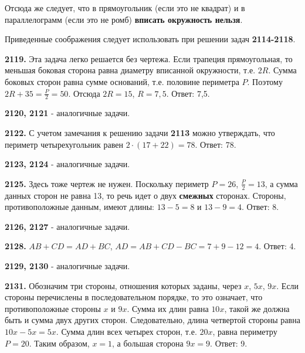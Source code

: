 Отсюда же следует, что в прямоугольник (если это не квадрат) и в параллелограмм (если это не ромб) \textbf{вписать окружность нельзя}.  

Приведенные соображения следует использовать при решении задач \textbf{2114-2118}.

\textbf{2119.} Эта задача легко решается без чертежа. Если трапеция прямоугольная, то меньшая боковая сторона равна диаметру вписанной окружности, т.е. $2R$. Сумма боковых сторон равна сумме оснований, т.е. половине периметра $P$. Поэтому $2R+35=\frac{P}{2}=50$. Отсюда $2R=15$, $R=7,5$. \newline \null \hspace*{\fill} Ответ: 7,5.

\textbf{2120, 2121} - аналогичные задачи.

\textbf{2122.} С учетом замечания к решению задачи \textbf{2113} можно утверждать, что периметр четырехугольник равен $2\cdot(17+22)=78$. \newline \null \hspace*{\fill} Ответ: 78.

\textbf{2123, 2124} - аналогичные задачи.

\textbf{2125.} Здесь тоже чертеж не нужен. Поскольку периметр $P=26$, $\frac{P}{2}=13$, а сумма данных сторон не равна 13, то речь идет о двух \textbf{смежных} сторонах. Стороны, противоположные данным, \clearpage имеют длины: $13-5=8$ и $13-9=4$. \newline \null \hspace*{\fill} Ответ: 8.

\textbf{2126, 2127} - аналогичные задачи.

\textbf{2128.} $AB+CD=AD+BC$, $AD=AB+CD-BC=7+9-12=4.$ \newline \null \hspace*{\fill} Ответ: 4.

\textbf{2129, 2130} - аналогичные задачи.

\textbf{2131.} Обозначим три стороны, отношения которых заданы, через $x$, $5x$, $9x$. Если стороны перечислены в последовательном порядке, то это означает, что противоположные стороны $x$ и $9x$. Сумма их длин равна $10x$, такой же должна быть и сумма двух других сторон. Следовательно, длина четвертой стороны равна $10x-5x=5x$. Сумма длин всех четырех сторон, т.е. $20x$, равна периметру $P=20$. Таким образом, $x=1$, а большая сторона $9x=9$. \newline \null \hspace*{\fill} Ответ: 9.

